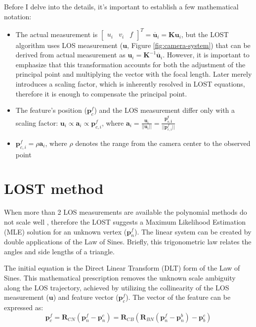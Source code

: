 Before I delve into the details, it's important to establish a few mathematical notation:
\begin{itemize}
    \item The actual measurement is $\begin{bmatrix} u_i & v_i & f\end{bmatrix}^T = \overline{\mathbf{u}}_i = \mathbf{K}\mathbf{u}_i$, but the LOST algorithm uses LOS measurement ($\mathbf{u}$, Figure \ref{fig:camera-system}) that can be derived from actual measurement as $\mathbf{u}_i=\mathbf{K}^{-1}\overline{\mathbf{u}}_i$. However, it is important to emphasize that this transformation accounts for both the adjustment of the principal point and multiplying the vector with the focal length. Later merely introduces a scaling factor, which is inherently resolved in LOST equations, therefore it is enough to compensate the principal point.
    \item The feature's position ($\mathbf{p}_c^f$) and the LOS measurement differ only with a scaling factor: $\mathbf{u}_i \propto \mathbf{a}_i \propto \mathbf{p}_{c,i}^f$, where $\mathbf{a}_i=\frac{\mathbf{u}_i}{||\mathbf{u}_i||} = \frac{\mathbf{p_{c,i}^f}}{||\mathbf{p}_{c,i}^f||}$ 
    \item $\mathbf{p}_{c,i}^f=\rho\mathbf{a}_i$, where $\rho$ denotes the range from the camera center to the observed point
\end{itemize}

\section{LOST method}

When more than 2 LOS measurements are available the polynomial methods do not scale well \cite{absolute-triangulation}, therefore the LOST suggests a Maximum Likelihood Estimation (MLE) solution for an unknown vertex ($\mathbf{p}_n^f$). The linear system can be created by double applications of the Law of Sines. Briefly, this trigonometric law relates the angles and side lengths of a triangle. 

The initial equation is the Direct Linear Transform (DLT) form of the Law of Sines. This mathematical prescription removes the unknown scale ambiguity along the LOS trajectory, achieved by utilizing the collinearity of the LOS measurement ($\mathbf{u}$) and feature vector ($\mathbf{p}_c^f$). The vector of the feature can be expressed as: 
\begin{equation}
    \mathbf{p}_c^f=\mathbf{R}_{CN}(\mathbf{p}_n^f-\mathbf{p}_n^c)=\mathbf{R}_{CB}(\mathbf{R}_{BN}(\mathbf{p}_n^f-\mathbf{p}_n^b)-\mathbf{p}_b^c)
    \label{eq:feature-in-cam}
\end{equation}

